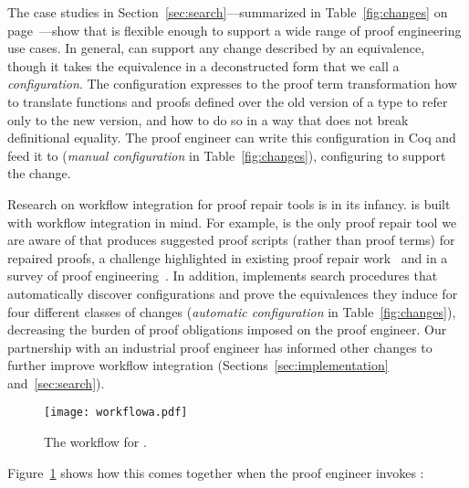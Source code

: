 The case studies in Section~\ref{sec:search}---summarized in Table~\ref{fig:changes} on page~\pageref{fig:changes}---show that \toolname is flexible enough to support
a wide range of proof engineering use cases. %
In general, \toolname can support any change described by an equivalence, though it takes the equivalence in a
deconstructed form that we call a \textit{configuration}.
The configuration expresses to the proof term transformation how to translate functions and proofs defined over the old version of a type
to refer only to the new version, and how to do so in a way that does not break definitional equality.
The proof engineer can write this configuration in Coq and feed it to \toolname (\textit{manual configuration} in Table~\ref{fig:changes}),
configuring \toolname to support the change. %

Research on workflow integration for proof repair tools is in its infancy.
\toolname is built with workflow integration in mind.
For example, \toolname is the only proof repair tool we are aware of that produces suggested proof scripts (rather than proof terms) for repaired proofs,
a challenge highlighted in existing proof repair work~\cite{pumpkinpatch, robert2018} and in 
a survey of proof engineering~\cite{PGL-045}.
In addition, \toolname implements search procedures that 
automatically discover configurations and prove the equivalences they induce for four different classes of 
changes (\textit{automatic configuration} in Table~\ref{fig:changes}),
decreasing the burden of proof obligations imposed on the proof engineer.
Our partnership with an industrial proof engineer has informed other changes to further improve workflow integration
(Sections~\ref{sec:implementation} and~\ref{sec:search}).

\begin{figure}
\texttt{[image: workflowa.pdf]}
\vspace{-0.7cm}
\caption{The workflow for \toolname.}
\vspace{-0.1cm}
\label{fig:system}
\end{figure}

Figure~\ref{fig:system} shows how this comes together when the proof engineer invokes \toolname:

